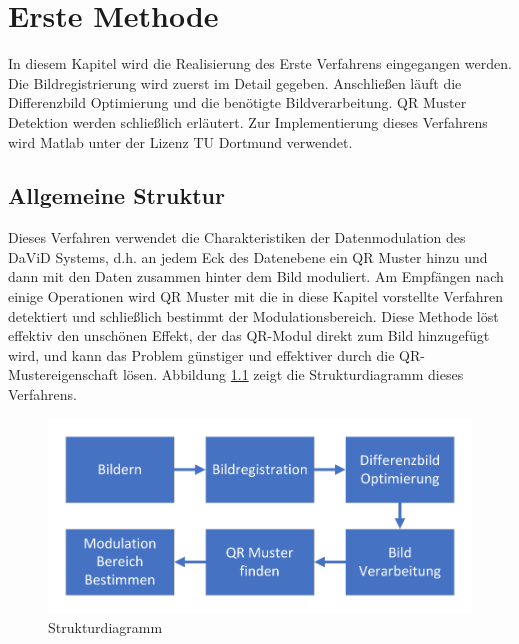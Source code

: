 \chapter{Erste Methode} \label{cha:Erste Methode}

In diesem Kapitel wird die Realisierung des Erste Verfahrens eingegangen werden. Die Bildregistrierung wird zuerst im Detail gegeben. Anschließen läuft die Differenzbild Optimierung und die benötigte Bildverarbeitung. QR Muster Detektion werden schließlich erläutert. Zur Implementierung dieses Verfahrens wird Matlab unter der Lizenz TU Dortmund verwendet.

\section{Allgemeine Struktur} 

Dieses Verfahren verwendet die Charakteristiken der Datenmodulation des DaViD Systems, d.h. an jedem Eck des Datenebene ein QR Muster hinzu und dann mit den Daten zusammen hinter dem Bild moduliert. Am Empfängen nach einige Operationen   wird QR Muster mit die in diese Kapitel vorstellte Verfahren detektiert und schließlich bestimmt der Modulationsbereich. Diese Methode löst effektiv den unschönen Effekt, der das QR-Modul direkt zum Bild hinzugefügt wird, und kann das Problem günstiger und effektiver durch die QR-Mustereigenschaft lösen. Abbildung \ref{fig:Strukturdiagramm} zeigt die Strukturdiagramm dieses Verfahrens.

\begin{figure}[H]
 \centering 
 \includegraphics[keepaspectratio,width=1.0\textwidth]{images/3_Ersteverfahren/Strukturdiagramm.pdf}
 \caption{Strukturdiagramm}
 \label{fig:Strukturdiagramm}
\end{figure}

